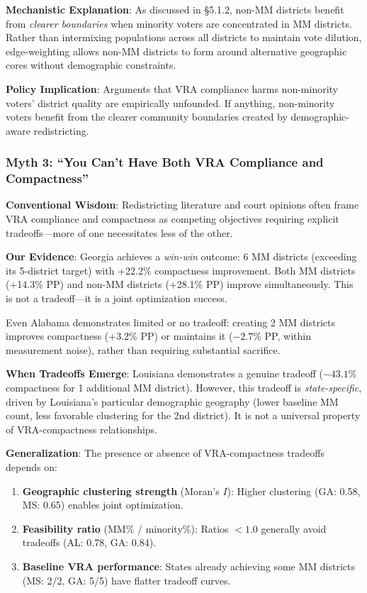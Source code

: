 \textbf{Mechanistic Explanation}: As discussed in \S5.1.2, non-MM districts benefit from \emph{clearer boundaries} when minority voters are concentrated in MM districts. Rather than intermixing populations across all districts to maintain vote dilution, edge-weighting allows non-MM districts to form around alternative geographic cores without demographic constraints.

\textbf{Policy Implication}: Arguments that VRA compliance harms non-minority voters' district quality are empirically unfounded. If anything, non-minority voters benefit from the clearer community boundaries created by demographic-aware redistricting.

\subsubsection{Myth 3: ``You Can't Have Both VRA Compliance and Compactness''}

\textbf{Conventional Wisdom}: Redistricting literature and court opinions often frame VRA compliance and compactness as competing objectives requiring explicit tradeoffs---more of one necessitates less of the other.

\textbf{Our Evidence}: Georgia achieves a \emph{win-win} outcome: 6 MM districts (exceeding its 5-district target) with +22.2\% compactness improvement. Both MM districts (+14.3\% PP) and non-MM districts (+28.1\% PP) improve simultaneously. This is not a tradeoff---it is a joint optimization success.

Even Alabama demonstrates limited or no tradeoff: creating 2 MM districts improves compactness (+3.2\% PP) or maintains it ($-2.7$\% PP, within measurement noise), rather than requiring substantial sacrifice.

\textbf{When Tradeoffs Emerge}: Louisiana demonstrates a genuine tradeoff ($-43.1$\% compactness for 1 additional MM district). However, this tradeoff is \emph{state-specific}, driven by Louisiana's particular demographic geography (lower baseline MM count, less favorable clustering for the 2nd district). It is not a universal property of VRA-compactness relationships.

\textbf{Generalization}: The presence or absence of VRA-compactness tradeoffs depends on:
\begin{enumerate}
    \item \textbf{Geographic clustering strength} (Moran's $I$): Higher clustering (GA: 0.58, MS: 0.65) enables joint optimization.
    \item \textbf{Feasibility ratio} (MM\% / minority\%): Ratios $<1.0$ generally avoid tradeoffs (AL: 0.78, GA: 0.84).
    \item \textbf{Baseline VRA performance}: States already achieving some MM districts (MS: 2/2, GA: 5/5) have flatter tradeoff curves.
\end{enumerate}


